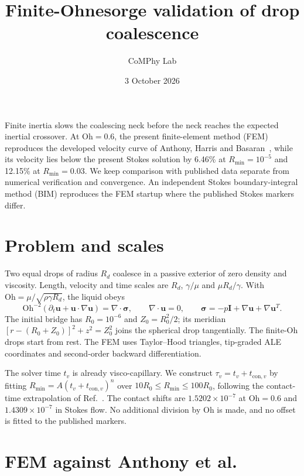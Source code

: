 \documentclass[10pt,a4paper]{article}
\title{Finite-Ohnesorge validation of drop coalescence}
\author{CoMPhy Lab}
\date{3 October 2026}
\newcommand{\Oh}{\mathrm{Oh}}
\newcommand{\Rmin}{R_{\min}}
\begin{document}
\maketitle

Finite inertia slows the coalescing neck before the neck reaches the expected
inertial crossover. At $\Oh=0.6$, the present finite-element method (FEM)
reproduces the developed velocity curve of Anthony, Harris and
Basaran~\cite{Anthony2020}, while its velocity lies below the present Stokes
solution by 6.46\% at $\Rmin=10^{-5}$ and 12.15\% at $\Rmin=0.03$.
We keep comparison with published data separate from numerical verification
and convergence. An independent Stokes boundary-integral method (BIM)
reproduces the FEM startup where the published Stokes markers differ.



\section{Problem and scales}
Two equal drops of radius $R_d$ coalesce in a passive exterior of zero
density and viscosity. Length, velocity and time scales are $R_d$,
$\gamma/\mu$ and $\mu R_d/\gamma$. With
$\Oh=\mu/\sqrt{\rho\gamma R_d}$, the liquid obeys
\begin{equation}
\Oh^{-2}(\partial_t\boldsymbol{u}+\boldsymbol{u}\cdot\nabla\boldsymbol{u})
=\nabla\cdot\boldsymbol{\sigma},\qquad
\nabla\cdot\boldsymbol{u}=0,\qquad
\boldsymbol{\sigma}=-p\boldsymbol{I}+\nabla\boldsymbol{u}+\nabla\boldsymbol{u}^{T}.
\end{equation}
The initial bridge has $R_0=10^{-6}$ and $Z_0=R_0^2/2$; its meridian
$[r-(R_0+Z_0)]^2+z^2=Z_0^2$ joins the spherical drop tangentially.
The finite-Oh drops start from rest. The FEM uses Taylor--Hood triangles,
tip-graded ALE coordinates and second-order backward differentiation.

The solver time $t_v$ is already visco-capillary. We construct
$\tau_v=t_v+t_{\mathrm{con},v}$ by fitting
$\Rmin=A(t_v+t_{\mathrm{con},v})^n$ over $10R_0\leq\Rmin\leq100R_0$,
following the contact-time extrapolation of Ref.~\cite{Anthony2020}.
The contact shifts are $1.5202\times10^{-7}$ at $\Oh=0.6$ and
$1.4309\times10^{-7}$ in Stokes flow. No additional division by Oh is
made, and no offset is fitted to the published markers.

\clearpage
\section{FEM against Anthony et al.}

\end{document}
